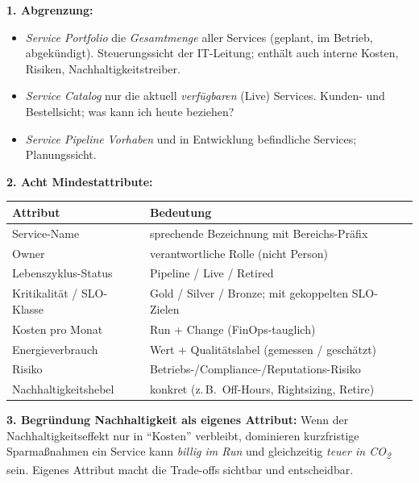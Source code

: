 \documentclass[11pt,a4paper,oneside]{article}
\begin{document}
\begin{loesungbox}
\textbf{1. Abgrenzung:}
\begin{itemize}
  \item \emph{Service Portfolio} \textendash{} die \emph{Gesamtmenge} aller Services (geplant, im Betrieb, abgek\"undigt). Steuerungssicht der IT-Leitung; enth\"alt auch interne Kosten, Risiken, Nachhaltigkeits\-treiber.
  \item \emph{Service Catalog} \textendash{} nur die aktuell \emph{verf\"ugbaren} (Live) Services. Kunden- und Bestellsicht; was kann ich heute beziehen?
  \item \emph{Service Pipeline} \textendash{} \emph{Vorhaben} und in Entwicklung befindliche Services; Planungssicht.
\end{itemize}

\smallskip
\textbf{2. Acht Mindestattribute:}

\smallskip
\begin{tabularx}{\linewidth}{@{}p{4.0cm}X@{}}
\toprule
\textbf{Attribut} & \textbf{Bedeutung} \\
\midrule
Service-Name              & sprechende Bezeichnung mit Bereichs-Pr\"afix \\
Owner                     & verantwortliche Rolle (nicht Person) \\
Lebenszyklus-Status       & Pipeline / Live / Retired \\
Kritikalit\"at / SLO-Klasse & Gold / Silver / Bronze; mit gekoppelten SLO-Zielen \\
Kosten pro Monat          & Run + Change (FinOps-tauglich) \\
Energieverbrauch          & Wert + Qualit\"atslabel (gemessen / gesch\"atzt) \\
Risiko                    & Betriebs-/Compliance-/Reputations-Risiko \\
Nachhaltigkeitshebel      & konkret (z.\,B.\ Off-Hours, Rightsizing, Retire) \\
\bottomrule
\end{tabularx}

\smallskip
\textbf{3. Begr\"undung Nachhaltigkeit als eigenes Attribut:} Wenn der Nachhaltigkeitseffekt nur in ``Kosten'' verbleibt, dominieren kurzfristige Sparma{\ss}nahmen \textendash{} ein Service kann \emph{billig im Run} und gleichzeitig \emph{teuer in CO\textsubscript{2}} sein. Eigenes Attribut macht die Trade-offs sichtbar und entscheidbar.
\end{loesungbox}

\clearpage
\end{document}
